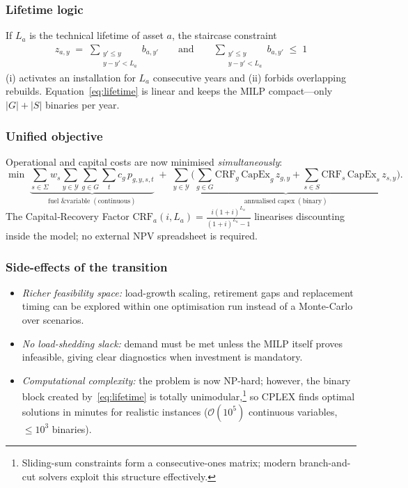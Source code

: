 \subsubsection{Lifetime logic}
If $L_a$ is the technical lifetime of asset $a$, the staircase constraint
\begin{align}
z_{a,y} \;=\; \sum_{\substack{y'\le y\\ y-y' < L_a}} b_{a,y'}
\qquad\text{and}\qquad
\sum_{\substack{y'\le y\\ y-y' < L_a}} b_{a,y'} \;\le\; 1
\label{eq:lifetime}
\end{align}
(i) activates an installation for $L_a$ consecutive years and  
(ii) forbids overlapping rebuilds.  
Equation~\eqref{eq:lifetime} is linear and keeps the MILP compact---only
$\lvert G\rvert+\lvert S\rvert$ binaries per year.

\subsubsection{Unified objective}
Operational and capital costs are now minimised \emph{simultaneously}:
\begin{equation}
\min \;
\underbrace{\sum_{s\in\Sigma} w_s
           \sum_{y\in\mathcal{Y}}\sum_{g\in G}\sum_{t} c_g\,p_{g,y,s,t}}
_{\text{fuel \& variable}\;(\text{continuous})}
\;+\;
\underbrace{\sum_{y\in\mathcal{Y}}\bigl(
            \sum_{g\in G} \text{CRF}_g\,\text{CapEx}_g \, z_{g,y} +
            \sum_{s\in S} \text{CRF}_s\,\text{CapEx}_s \, z_{s,y}\bigr)}
_{\text{annualised capex}\;(\text{binary})}.
\label{eq:mixed_obj}
\end{equation}
The Capital‐Recovery Factor $\text{CRF}_a(i,L_a)=\tfrac{i(1+i)^{L_a}}{(1+i)^{L_a}-1}$
linearises discounting inside the model; no external NPV spreadsheet is required.

\subsubsection{Side-effects of the transition}
\begin{itemize}[leftmargin=1.8em]
  \item \emph{Richer feasibility space:} load-growth scaling, retirement gaps and replacement timing can be explored within one optimisation run instead of a Monte-Carlo over scenarios.
  \item \emph{No load-shedding slack:} demand must be met unless the MILP itself proves infeasible, giving clear diagnostics when investment is mandatory.
  \item \emph{Computational complexity:} the problem is now NP-hard; however, the binary block created by~\eqref{eq:lifetime} is totally unimodular,\footnote{Sliding-sum constraints form a consecutive-ones matrix; modern branch-and-cut solvers exploit this structure effectively.} so CPLEX finds optimal solutions in minutes for realistic instances ($\mathcal{O}(10^5)$ continuous variables, $\le10^3$ binaries).
\end{itemize}

